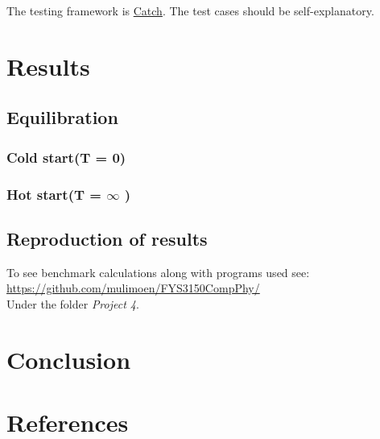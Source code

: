 \documentclass[11pt,a4paper,english]{article}
\numberwithin{equation}{section}
\begin{document}
The testing framework is \href{https://github.com/philsquared/Catch}{Catch}.
The test cases should be self-explanatory.


\section{Results}

\subsection{Equilibration}

\subsubsection{Cold start(T = 0)}

\subsubsection{Hot start(T = $\infty$ )}


\subsection{Reproduction of results}

To see benchmark calculations along with programs used see:\\
\url{https://github.com/mulimoen/FYS3150CompPhy/}\\
Under the folder \emph{Project 4}.

\section{Conclusion}

\section{References}
\end{document}

